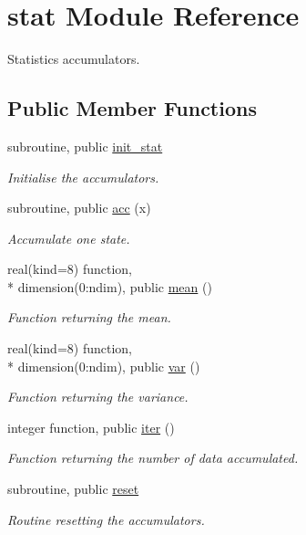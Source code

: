 \hypertarget{classstat}{\section{stat Module Reference}
\label{classstat}
}


Statistics accumulators.  


\subsection*{Public Member Functions}
\begin{DoxyCompactItemize}
\item 
subroutine, public \hyperlink{classstat_a17919a94d519a3b63199ca52590f03c8}{init\-\_\-stat}
\begin{DoxyCompactList}\small\item\em Initialise the accumulators. \end{DoxyCompactList}\item 
subroutine, public \hyperlink{classstat_a2f642f26a42651e2c0e7275b690deabe}{acc} (x)
\begin{DoxyCompactList}\small\item\em Accumulate one state. \end{DoxyCompactList}\item 
real(kind=8) function, \\*
dimension(0\-:ndim), public \hyperlink{classstat_ada9a5b64e944a67f5b840d7b91990100}{mean} ()
\begin{DoxyCompactList}\small\item\em Function returning the mean. \end{DoxyCompactList}\item 
real(kind=8) function, \\*
dimension(0\-:ndim), public \hyperlink{classstat_a32f0c1c215da5a0f2b92672ddb53dd13}{var} ()
\begin{DoxyCompactList}\small\item\em Function returning the variance. \end{DoxyCompactList}\item 
integer function, public \hyperlink{classstat_aca30ccb65a1fc6af92be1018ec40f6c6}{iter} ()
\begin{DoxyCompactList}\small\item\em Function returning the number of data accumulated. \end{DoxyCompactList}\item 
subroutine, public \hyperlink{classstat_aaf88c5c208ce1fac886a9e3c0ee5ae08}{reset}
\begin{DoxyCompactList}\small\item\em Routine resetting the accumulators. \end{DoxyCompactList}\end{DoxyCompactItemize}
